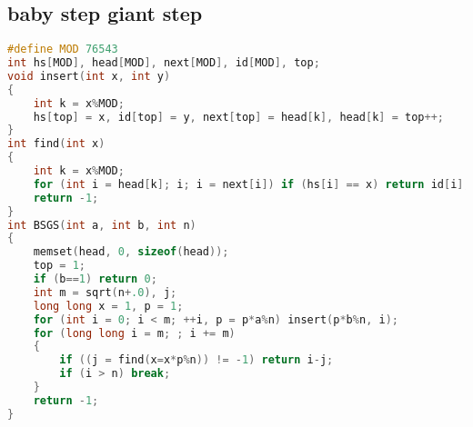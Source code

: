 \subsection{baby step giant step}
	\begin{lstlisting}[language=c++]
#define MOD 76543
int hs[MOD], head[MOD], next[MOD], id[MOD], top;
void insert(int x, int y)
{
	int k = x%MOD;
	hs[top] = x, id[top] = y, next[top] = head[k], head[k] = top++;
}
int find(int x)
{
	int k = x%MOD;
	for (int i = head[k]; i; i = next[i]) if (hs[i] == x) return id[i];
	return -1;
}
int BSGS(int a, int b, int n)
{
	memset(head, 0, sizeof(head));
	top = 1;
	if (b==1) return 0;
	int m = sqrt(n+.0), j;
	long long x = 1, p = 1;
	for (int i = 0; i < m; ++i, p = p*a%n) insert(p*b%n, i);
	for (long long i = m; ; i += m)
	{
		if ((j = find(x=x*p%n)) != -1) return i-j;
		if (i > n) break;
	}
	return -1;
}
	\end{lstlisting}
